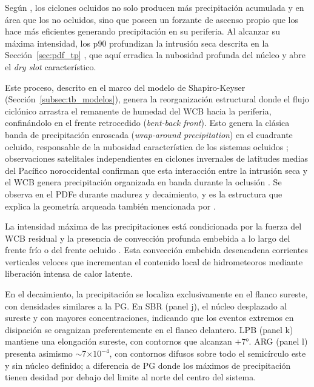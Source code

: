 Según \citet{naud2025lifecycle}, los ciclones ocluidos no solo producen más precipitación acumulada y en área que los no ocluidos, sino que poseen un forzante de ascenso propio que los hace más eficientes generando precipitación en su periferia. Al alcanzar su máxima intensidad, los p90 profundizan la intrusión seca descrita en la Sección~\ref{sec:pdf_tp} \citep{shapiro1999bridge}, que aquí erradica la nubosidad profunda del núcleo y abre el \textit{dry slot} característico.

Este proceso, descrito en el marco del modelo de Shapiro-Keyser (Sección~\ref{subsec:tb_modelos}), genera la reorganización estructural donde el flujo ciclónico arrastra el remanente de humedad del WCB hacia la periferia, confinándolo en el frente retrocedido (\textit{bent-back front}). Esto genera la clásica banda de precipitación enroscada (\textit{wrap-around precipitation}) en el cuadrante ocluido, responsable de la nubosidad característica de los sistemas ocluidos \citep{martin1999forcing}; observaciones satelitales independientes en ciclones invernales de latitudes medias del Pacífico noroccidental confirman que esta interacción entre la intrusión seca y el WCB genera precipitación organizada en banda durante la oclusión \citep{sawada2021heavy}. Se observa en el PDFe durante madurez y decaimiento, y es la estructura que explica la geometría arqueada también mencionada por \citet{schultz2021antecedents}.

La intensidad máxima de las precipitaciones está condicionada por la fuerza del WCB residual y la presencia de convección profunda embebida a lo largo del frente frío o del frente ocluido \citep{oertel2021warm, blanchard2021warm}. Esta convección embebida desencadena corrientes verticales veloces que incrementan el contenido local de hidrometeoros mediante liberación intensa de calor latente.

En el decaimiento, la precipitación se localiza exclusivamente en el flanco sureste, con densidades similares a la PG. 
En SBR (panel j), el núcleo desplazado al sureste y con mayores concentraciones, indicando que los eventos extremos en disipación se oragnizan preferentemente en el flanco delantero. 
LPB (panel k) mantiene una elongación sureste, con contornos que alcanzan $+$7°. 
ARG (panel l) presenta asimismo $\sim$7$\times10^{-4}$, con contornos difusos sobre todo el semicírculo este y sin núcleo definido; a diferencia de PG donde los máximos de precipitación tienen desidad por  debajo del limite al norte del centro del sistema.

